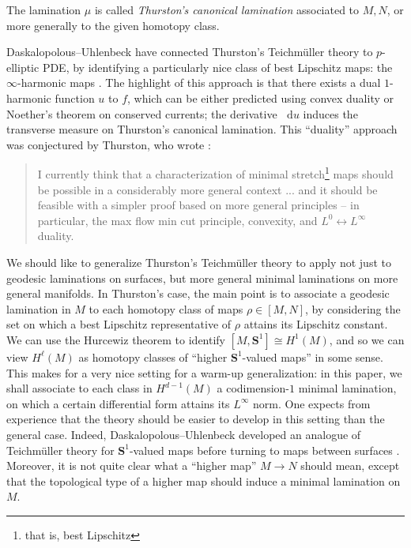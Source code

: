 \documentclass[reqno,11pt]{amsart}
\newcommand{\Sph}{\mathbf S}
\newcommand*\dif{\mathop{}\!\mathrm{d}}
\newcommand{\dfn}[1]{\emph{#1}\index{#1}}
\theoremstyle{definition}
\numberwithin{equation}{section}
\begin{document}
The lamination $\mu$ is called \dfn{Thurston's canonical lamination} associated to $M, N$, or more generally to the given homotopy class.

Daskalopolous--Uhlenbeck have connected Thurston's Teichm\"uller theory to $p$-elliptic PDE, by identifying a particularly nice class of best Lipschitz maps: the $\infty$-harmonic maps \cite{daskalopoulos2022}.
The highlight of this approach is that there exists a dual $1$-harmonic function $u$ to $f$, which can be either predicted using convex duality or Noether's theorem on conserved currents; the derivative $\dif u$ induces the transverse measure on Thurston's canonical lamination.
This ``duality'' approach was conjectured by Thurston, who wrote \cite{Thurston98}:

\begin{quote}
I currently think that a characterization of minimal stretch\footnote{that is, best Lipschitz} maps should be possible in a considerably more general context ... and it should be feasible with a simpler proof based on more general principles -- in particular, the max flow min cut principle, convexity, and $L^0 \leftrightarrow L^\infty$ duality.
\end{quote}

We should like to generalize Thurston's Teichm\"uller theory to apply not just to geodesic laminations on surfaces, but more general minimal laminations on more general manifolds.
In Thurston's case, the main point is to associate a geodesic lamination in $M$ to each homotopy class of maps $\rho \in [M, N]$, by considering the set on which a best Lipschitz representative of $\rho$ attains its Lipschitz constant.
We can use the Hurcewiz theorem to identify $[M, \Sph^1] \cong H^1(M)$, and so we can view $H^\ell(M)$ as homotopy classes of ``higher $\Sph^1$-valued maps'' in some sense.
This makes for a very nice setting for a warm-up generalization: in this paper, we shall associate to each class in $H^{d - 1}(M)$ a codimension-$1$ minimal lamination, on which a certain differential form attains its $L^\infty$ norm.
One expects from experience that the theory should be easier to develop in this setting than the general case.
Indeed, Daskalopolous--Uhlenbeck developed an analogue of Teichm\"uller theory for $\Sph^1$-valued maps before turning to maps between surfaces \cite{daskalopoulos2020transverse}.
Moreover, it is not quite clear what a ``higher map'' $M \to N$ should mean, except that the topological type of a higher map should induce a minimal lamination on $M$.
\end{document}
